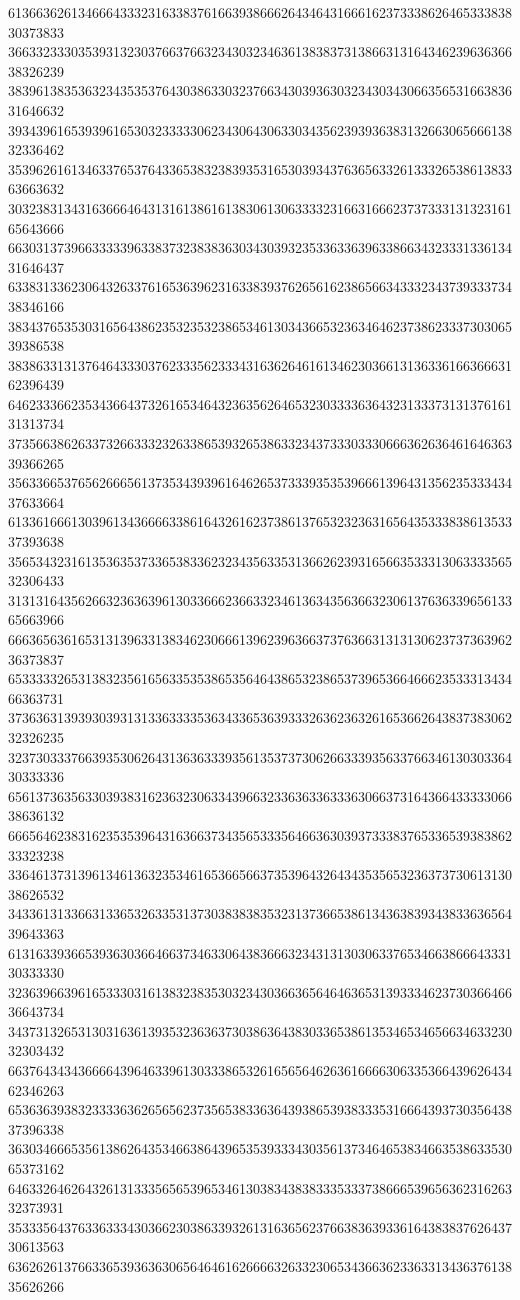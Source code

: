 61366362613466643332316338376166393866626434643166616237333862646533383830373833
36633233303539313230376637663234303234636138383731386631316434623963636638326239
38396138353632343535376430386330323766343039363032343034306635653166383631646632
39343961653939616530323333306234306430633034356239393638313266306566613832336462
35396261613463376537643365383238393531653039343763656332613332653861383363663632
30323831343163666464313161386161383061306333323166316662373733313132316165643666
66303137396633333963383732383836303430393235336336396338663432333133613431646437
63383133623064326337616536396231633839376265616238656634333234373933373438346166
38343765353031656438623532353238653461303436653236346462373862333730306539386538
38386331313764643330376233356233343163626461613462303661313633616636663162396439
64623336623534366437326165346432363562646532303333636432313337313137616131313734
37356638626337326633323263386539326538633234373330333066636263646164636339366265
35633665376562666561373534393961646265373339353539666139643135623533343437633664
61336166613039613436666338616432616237386137653232363165643533383861353337393638
35653432316135363537336538336232343563353136626239316566353331306333356532306433
31313164356266323636396130336662366332346136343563663230613763633965613365663966
66636563616531313963313834623066613962396366373763663131313062373736396236373837
65333332653138323561656335353865356464386532386537396536646662353331343466363731
37363631393930393131336333353634336536393332636236326165366264383738306232326235
32373033376639353062643136363339356135373730626633393563376634613030336430333336
65613736356330393831623632306334396632336363363336306637316436643333306638636132
66656462383162353539643163663734356533356466363039373338376533653938386233323238
33646137313961346136323534616536656637353964326434353565323637373061313038626532
34336131336631336532633531373038383835323137366538613436383934383363656439643363
61316339366539363036646637346330643836663234313130306337653466386664333130333330
32363966396165333031613832383530323430366365646463653139333462373036646636643734
34373132653130316361393532363637303863643830336538613534653465663463323032303432
66376434343666643964633961303338653261656564626361666630633536643962643462346263
65363639383233336362656562373565383363643938653938333531666439373035643837396338
36303466653561386264353466386439653539333430356137346465383466353863353065373162
64633264626432613133356565396534613038343838333533373866653965636231626332373931
35333564376336333430366230386339326131636562376638363933616438383762643730613563
63626261376633653936363065646461626666326332306534366362336331343637613835626266
